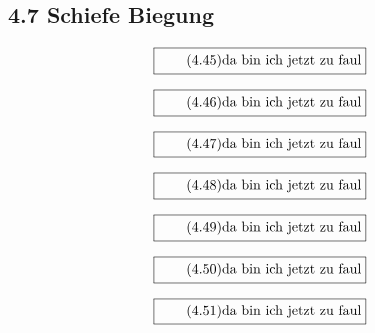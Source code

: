 \documentclass[11pt]{article}
\newcommand{\1}{ {\mathds{1}} }
\begin{document}
    \subsection*{4.7 Schiefe Biegung}

    \begin{equation}
      \boxed{
        \tag{4.45}
        \begin{split}
          \text{da bin ich jetzt zu faul}
        \end{split}
      }
    \end{equation}
    
    \begin{equation}
      \boxed{
        \tag{4.46}
        \begin{split}
          \text{da bin ich jetzt zu faul}
        \end{split}
      }
    \end{equation}

    \begin{equation}
      \boxed{
        \tag{4.47}
        \begin{split}
          \text{da bin ich jetzt zu faul}
        \end{split}
      }
    \end{equation}

    \begin{equation}
      \boxed{
        \tag{4.48}
        \begin{split}
          \text{da bin ich jetzt zu faul}
        \end{split}
      }
    \end{equation}
    
    \begin{equation}
      \boxed{
        \tag{4.49}
        \begin{split}
          \text{da bin ich jetzt zu faul}
        \end{split}
      }
    \end{equation}
    
    \begin{equation}
      \boxed{
        \tag{4.50}
        \begin{split}
          \text{da bin ich jetzt zu faul}
        \end{split}
      }
    \end{equation}
    
    \begin{equation}
      \boxed{
        \tag{4.51}
        \begin{split}
          \text{da bin ich jetzt zu faul}
        \end{split}
      }
    \end{equation}
    
\end{document}
